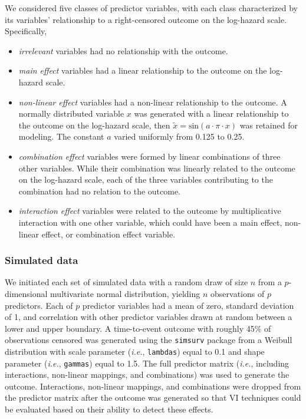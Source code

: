 \documentclass[12pt]{article}\usepackage[]{graphicx}\usepackage[]{xcolor}
\newcommand{\ie}{\textit{i.e.}}
\begin{document}
We considered five classes of predictor variables, with each class characterized by its variables' relationship to a right-censored outcome on the log-hazard scale. Specifically, \begin{itemize}
\item \textit{irrelevant} variables had no relationship with the outcome.
\item \textit{main effect} variables had a linear relationship to the outcome on the log-hazard scale.
\item \textit{non-linear effect} variables had a non-linear relationship to the outcome. A normally distributed variable $x$ was generated with a linear relationship to the outcome on the log-hazard scale, then $\tilde{x} = \text{sin}(a \cdot \pi \cdot x)$ was retained for modeling. The constant $a$ varied uniformly from 0.125 to 0.25.
\item \textit{combination effect} variables were formed by linear combinations of three other variables. While their combination was linearly related to the outcome on the log-hazard scale, each of the three variables contributing to the combination had no relation to the outcome.
\item \textit{interaction effect} variables were related to the outcome by multiplicative interaction with one other variable, which could have been a main effect, non-linear effect, or combination effect variable.
\end{itemize}

\subsubsection{Simulated data} \label{sec:data_sim}

We initiated each set of simulated data with a random draw of size $n$ from a $p$-dimensional multivariate normal distribution, yielding $n$ observations of $p$ predictors. Each of $p$ predictor variables had a mean of zero, standard deviation of 1, and correlation with other predictor variables drawn at random between a lower and upper boundary. A time-to-event outcome with roughly 45\% of observations censored was generated using the \texttt{simsurv} package \citep{simsurv, simsurv_paper} from a Weibull distribution with scale parameter (\ie, \texttt{lambdas}) equal to 0.1 and shape parameter (\ie, \texttt{gammas}) equal to 1.5. The full predictor matrix (\ie, including interactions, non-linear mappings, and combinations) was used to generate the outcome. Interactions, non-linear mappings, and combinations were dropped from the predictor matrix after the outcome was generated so that VI techniques could be evaluated based on their ability to detect these effects.
\end{document}
